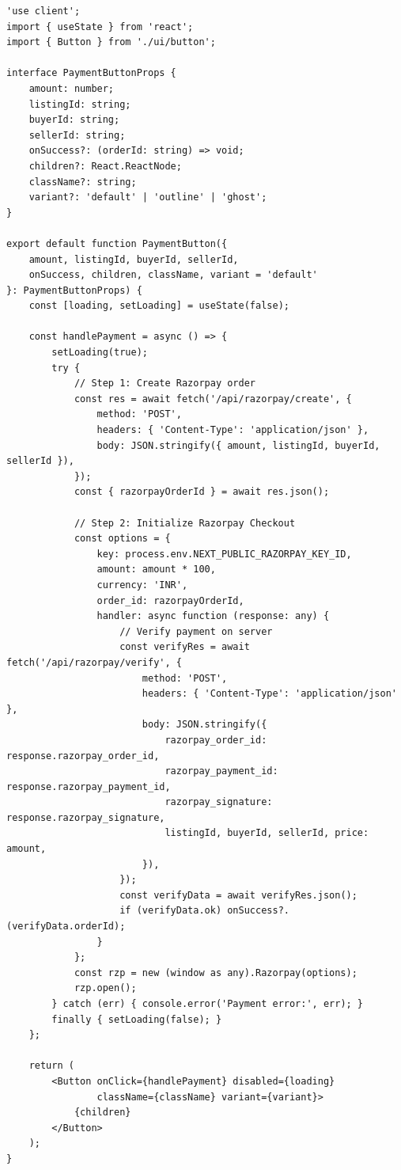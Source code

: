 \documentclass[a4paper,12pt,oneside]{report}
\begin{document}
\begin{lstlisting}[caption={Payment Button Component (payment-button.tsx)}, label={lst:payment}]
'use client';
import { useState } from 'react';
import { Button } from './ui/button';

interface PaymentButtonProps {
    amount: number;
    listingId: string;
    buyerId: string;
    sellerId: string;
    onSuccess?: (orderId: string) => void;
    children?: React.ReactNode;
    className?: string;
    variant?: 'default' | 'outline' | 'ghost';
}

export default function PaymentButton({
    amount, listingId, buyerId, sellerId,
    onSuccess, children, className, variant = 'default'
}: PaymentButtonProps) {
    const [loading, setLoading] = useState(false);

    const handlePayment = async () => {
        setLoading(true);
        try {
            // Step 1: Create Razorpay order
            const res = await fetch('/api/razorpay/create', {
                method: 'POST',
                headers: { 'Content-Type': 'application/json' },
                body: JSON.stringify({ amount, listingId, buyerId, sellerId }),
            });
            const { razorpayOrderId } = await res.json();

            // Step 2: Initialize Razorpay Checkout
            const options = {
                key: process.env.NEXT_PUBLIC_RAZORPAY_KEY_ID,
                amount: amount * 100,
                currency: 'INR',
                order_id: razorpayOrderId,
                handler: async function (response: any) {
                    // Verify payment on server
                    const verifyRes = await fetch('/api/razorpay/verify', {
                        method: 'POST',
                        headers: { 'Content-Type': 'application/json' },
                        body: JSON.stringify({
                            razorpay_order_id: response.razorpay_order_id,
                            razorpay_payment_id: response.razorpay_payment_id,
                            razorpay_signature: response.razorpay_signature,
                            listingId, buyerId, sellerId, price: amount,
                        }),
                    });
                    const verifyData = await verifyRes.json();
                    if (verifyData.ok) onSuccess?.(verifyData.orderId);
                }
            };
            const rzp = new (window as any).Razorpay(options);
            rzp.open();
        } catch (err) { console.error('Payment error:', err); }
        finally { setLoading(false); }
    };

    return (
        <Button onClick={handlePayment} disabled={loading} 
                className={className} variant={variant}>
            {children}
        </Button>
    );
}
\end{lstlisting}
\end{document}
